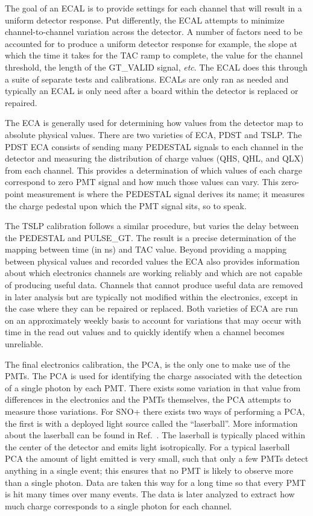 The goal of an ECAL is to provide settings for each channel that will result in a uniform
detector response. Put differently, the ECAL attempts to minimize channel-to-channel variation
across the detector.
A number of factors need to be accounted for to produce a uniform detector response for example,
the slope at which the time it takes for the TAC ramp to complete, the value for the
channel threshold, the length of the GT\_VALID signal, \textit{etc}.
The ECAL does this through a suite of separate tests and calibrations.
ECALs are only ran as needed and typically an ECAL is only need after a board within the
detector is replaced or repaired.

The ECA is generally used for determining how values from the detector map to absolute
physical values.
There are two varieties of ECA,  PDST and  TSLP\@.
The PDST ECA consists of sending many PEDESTAL signals to each channel in the detector and
measuring the distribution of charge values (QHS, QHL, and QLX) from each channel.
This provides a determination of which values of each charge correspond to zero PMT
signal and how much those values can vary.
This zero-point measurement is where the PEDESTAL signal derives its name; it measures
the charge pedestal upon which the PMT signal sits, so to speak.

The TSLP calibration follows a similar procedure, but varies the delay between
the PEDESTAL and PULSE\_GT\@.
The result is a precise determination of the mapping between time (in ns) and
TAC value.
Beyond providing a mapping between physical values and recorded values the ECA
also provides information about which electronics channels are working reliably
and which are not capable of producing useful data.
Channels that cannot produce useful data are removed in later analysis but are
typically not modified within the electronics, except in the case where they
can be repaired or replaced.
Both varieties of ECA are run on an approximately weekly basis to account for
variations that may occur with time in the read out values and to quickly
identify when a channel becomes unreliable.

The final electronics calibration, the PCA, is the only one to make use of the PMTs.
The PCA is used for identifying the charge associated with the detection of a single
photon by each PMT\@.
There exists some variation in that value from differences in the
electronics and the PMTs themselves, the PCA attempts to measure those variations.
For SNO+ there exists two ways of performing a PCA, the first is with a deployed light
source called the ``laserball''.
More information about the laserball can be found in Ref.~\citep{sno_laserball}.
The laserball is typically placed within the center of the
detector and emits light isotropically. For a typical laserball PCA the amount of light emitted
is very small, such that only a few PMTs detect anything in a single event;
this ensures that no PMT is likely to observe more than a single photon.
Data are taken this way for a long time so that every PMT is hit many times over
many events. The data is later analyzed to extract how much charge corresponds to a single
photon for each channel.

